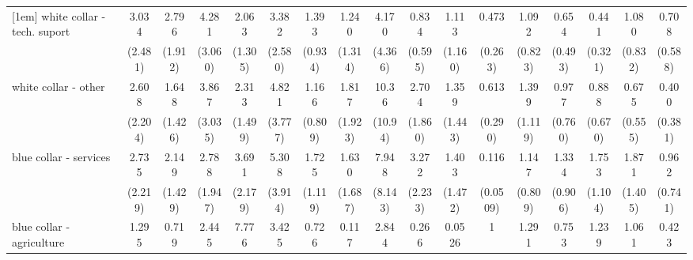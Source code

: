 {\begin{tabular}{l*{16}{c}}
[1em]
white collar - tech. suport&       3.034         &       2.796         &       4.281\sym{*}  &       2.063         &       3.382         &       1.393         &       1.240         &       4.170         &       0.834         &       1.113         &       0.473         &       1.092         &       0.654         &       0.441         &       1.080         &       0.708         \\
                    &     (2.481)         &     (1.912)         &     (3.060)         &     (1.305)         &     (2.580)         &     (0.934)         &     (1.314)         &     (4.366)         &     (0.595)         &     (1.160)         &     (0.263)         &     (0.823)         &     (0.493)         &     (0.321)         &     (0.832)         &     (0.588)         \\
[1em]
white collar - other&       2.608         &       1.648         &       3.867         &       2.313         &       4.821\sym{*}  &       1.166         &       1.817         &       10.36\sym{*}  &       2.704         &       1.359         &       0.613         &       1.399         &       0.977         &       0.888         &       0.675         &       0.400         \\
                    &     (2.204)         &     (1.426)         &     (3.035)         &     (1.499)         &     (3.777)         &     (0.809)         &     (1.923)         &     (10.94)         &     (1.860)         &     (1.443)         &     (0.290)         &     (1.119)         &     (0.760)         &     (0.670)         &     (0.555)         &     (0.381)         \\
[1em]
blue collar - services&       2.735         &       2.149         &       2.788         &       3.691\sym{*}  &       5.308\sym{*}  &       1.725         &       1.630         &       7.948\sym{*}  &       3.272         &       1.403         &       0.116\sym{***}&       1.147         &       1.334         &       1.753         &       1.871         &       0.962         \\
                    &     (2.219)         &     (1.429)         &     (1.947)         &     (2.179)         &     (3.914)         &     (1.119)         &     (1.687)         &     (8.143)         &     (2.233)         &     (1.472)         &    (0.0509)         &     (0.809)         &     (0.906)         &     (1.104)         &     (1.405)         &     (0.741)         \\
[1em]
blue collar - agriculture&       1.295         &       0.719         &       2.445         &       7.776\sym{**} &       3.425         &       0.726         &       0.117         &       2.844         &       0.266         &      0.0526\sym{*}  &           1         &       1.291         &       0.753         &       1.239         &       1.061         &       0.423         \\

\end{tabular}}
